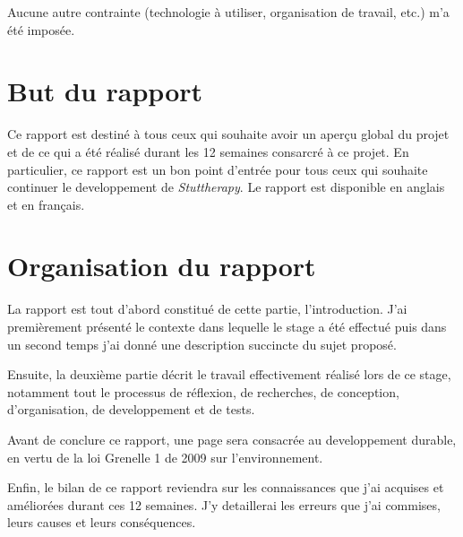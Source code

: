 Aucune autre contrainte (technologie à utiliser, organisation de travail, etc.) m'a été imposée.


\section{But du rapport}
Ce rapport est destiné à tous ceux qui souhaite avoir un aperçu global du projet et de ce qui a été réalisé durant les 12 semaines consarcré à ce projet. En particulier, ce rapport est un bon point d'entrée pour tous ceux qui souhaite continuer le developpement de \textit{Stuttherapy}. Le rapport est disponible en anglais et en français.

\section{Organisation du rapport}

La rapport est tout d'abord constitué de cette partie, l'introduction. J'ai premièrement présenté le contexte dans lequelle le stage a été effectué puis dans un second temps j'ai donné une description succincte du sujet proposé.

Ensuite, la deuxième partie décrit le travail effectivement réalisé lors de ce stage, notamment tout le processus de réflexion, de recherches, de conception, d'organisation, de developpement et de tests.

Avant de conclure ce rapport, une page sera consacrée au developpement durable, en vertu de la loi Grenelle 1 de 2009 sur l'environnement.

Enfin, le bilan de ce rapport reviendra sur les connaissances que j'ai acquises et améliorées durant ces 12 semaines. J'y detaillerai les erreurs que j'ai commises, leurs causes et leurs conséquences.























%
